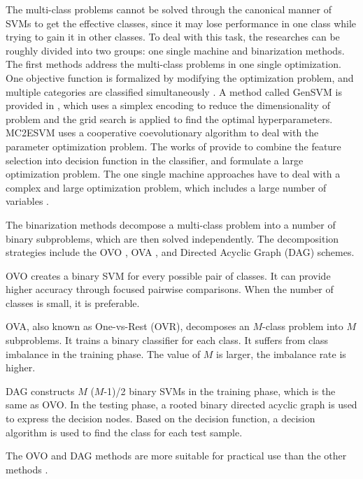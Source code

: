The multi-class problems cannot be solved through the canonical manner of SVMs to get the effective classes, since it may lose performance in one class while trying to gain it in other classes\cite{Fern2013Analysing}. To deal with this task, the researches can be roughly divided into two groups: one single machine and binarization methods. The first methods address the multi-class problems in one single optimization. One objective function is formalized by modifying the optimization problem, and multiple categories are classified simultaneously \cite{Weston1999SupportVM}\cite{singlemachine2016}. A method called GenSVM is provided in \cite{Gensvm2016}, which uses a simplex encoding to reduce the dimensionality of problem and the grid search is applied to find the optimal hyperparameters. MC2ESVM \cite{mc2esvm} uses a cooperative coevolutionary algorithm to deal with the parameter optimization problem. The works of \cite{GUO2021107988} provide to combine the feature selection into decision function in the classifier, and formulate a large optimization problem. The one single machine approaches have to deal with a complex and large optimization problem, which includes a large number of variables \cite{MSVMpack} \cite{mc2esvm}.

The binarization methods decompose a multi-class problem into a number of binary subproblems, which are then solved independently. The decomposition strategies include the OVO \cite{article_ovo}, OVA \cite{article_ova}, and Directed Acyclic Graph (DAG) \cite{dag1999} schemes. 

OVO creates a binary SVM for every possible pair of classes. It can provide higher accuracy through focused pairwise comparisons. When the number of classes is small, it is preferable. 


OVA, also known as One-vs-Rest (OVR), decomposes an $M$-class problem into $M$ subproblems. It trains a binary classifier for each class. It suffers from class imbalance in the training phase. The value of $M$ is larger, the imbalance rate is higher\cite{mc2esvm}.


DAG constructs $M$ ($M$-1)/2 binary SVMs in the training phase, which is the same as OVO. In the testing phase, a rooted binary directed acyclic graph is used to express the decision nodes. Based on the decision function, a decision algorithm is used to find the class for each test sample.


The OVO and DAG methods are more suitable for practical use than the other methods \cite{ComparingOVO}. 



